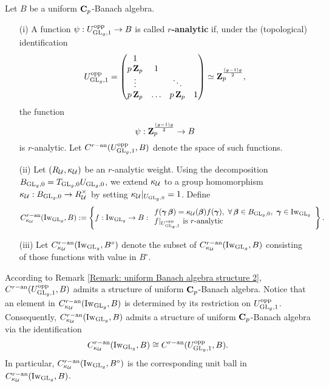 \begin{Definition}
Let $B$ be a uniform $\C_p$-Banach algebra.
\begin{enumerate}
\item[(i)] A function $\psi: U_{\GL_g, 1}^{\opp}\rightarrow B$ is called \textbf{$r$-analytic} if, under the (topological) identification
$$U^{\opp}_{\GL_g, 1}=\begin{pmatrix}1&&&\\p\Z_p&1&&\\\vdots&&\ddots&\\p\Z_p&\ldots&p\Z_p&1\end{pmatrix}\simeq \Z_p^{\frac{(g-1)g}{2}},$$
the function $$\psi:\Z_p^{\frac{(g-1)g}{2}}\rightarrow B$$
is $r$-analytic. Let $C^{r-\an}(U^{\opp}_{\GL_g,1}, B)$ denote the space of such functions. 
\item[(ii)] Let $(R_{\calU}, \kappa_{\calU})$ be an $r$-analytic weight. Using the decomposition $B_{\GL_g,0}=T_{\GL_g,0}U_{\GL_g,0}$, we extend $\kappa_{\calU}$ to a group homomorphism $\kappa_{\calU}: B_{\GL_g,0}\rightarrow R_{\calU}^{\times}$ by setting $\kappa_{\calU}|_{U_{\GL_g,0}}=1$. Define 
$$C^{r-\an}_{\kappa_{\calU}}(\Iw_{\GL_g}, B):=\left\{f: \Iw_{\GL_g}\rightarrow B: \begin{array}{l}
    f(\bfgamma\bfbeta)=\kappa_{\calU}(\bfbeta)f(\bfgamma),\,\,\forall \bfbeta\in B_{\GL_g, 0},\,\,\bfgamma \in \Iw_{\GL_g}\\
    f|_{U_{\GL_g, 1}^{\opp}}\text{ is $r$-analytic} 
\end{array}\right\}.$$ 
\item[(iii)] Let $C^{r-\an}_{\kappa_{\calU}}(\Iw_{\GL_g}, B^{\circ})$ denote the subset of $C^{r-\an}_{\kappa_{\calU}}(\Iw_{\GL_g}, B)$ consisting of those functions with value in $B^{\circ}$.
\end{enumerate}
\end{Definition}

\begin{Remark}\label{Remark: uniform Banach algebra structure 3}
\normalfont According to Remark \ref{Remark: uniform Banach algebra structure 2}, $C^{r-\an}(U^{\opp}_{\GL_g,1}, B)$ admits a structure of uniform $\C_p$-Banach algebra. Notice that an element in $C^{r-\an}_{\kappa_{\calU}}(\Iw_{\GL_g}, B)$ is determined by its restriction on $U^{\opp}_{\GL_g, 1}$. Consequently, $C^{r-\an}_{\kappa_{\calU}}(\Iw_{\GL_g}, B)$ admits a structure of uniform $\C_p$-Banach algebra via the identification $$C^{r-\an}_{\kappa_{\calU}}(\Iw_{\GL_g}, B)\cong C^{r-\an}(U^{\opp}_{\GL_g,1}, B).$$ In particular, $C^{r-\an}_{\kappa_{\calU}}(\Iw_{\GL_g}, B^{\circ})$ is the corresponding unit ball in $C^{r-\an}_{\kappa_{\calU}}(\Iw_{\GL_g}, B)$.
\end{Remark}

